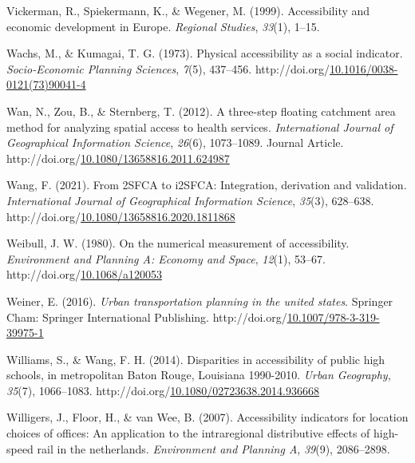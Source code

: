 \documentclass[
11pt, %
oneside, %
english, %
singlespacing, %
]{macthesis} %
\newlength{\cslhangindent}
\newenvironment{CSLReferences}[2] %
{\begin{list}{}{%
	\setlength{\itemindent}{0pt}
	\setlength{\leftmargin}{0pt}
	\setlength{\parsep}{0pt}
	\ifodd #1
	\setlength{\leftmargin}{\cslhangindent}
	\setlength{\itemindent}{-1\cslhangindent}
	\fi
	\setlength{\itemsep}{#2\baselineskip}}}
{\end{list}}
\begin{document}
\begin{CSLReferences}{1}{0}
Vickerman, R., Spiekermann, K., \& Wegener, M. (1999). Accessibility and economic development in {Europe}. \emph{Regional Studies}, \emph{33}(1), 1--15.

Wachs, M., \& Kumagai, T. G. (1973). Physical accessibility as a social indicator. \emph{Socio-Economic Planning Sciences}, \emph{7}(5), 437--456. http://doi.org/\href{https://doi.org/10.1016/0038-0121(73)90041-4}{10.1016/0038-0121(73)90041-4}

Wan, N., Zou, B., \& Sternberg, T. (2012). A three-step floating catchment area method for analyzing spatial access to health services. \emph{International Journal of Geographical Information Science}, \emph{26}(6), 1073--1089. Journal Article. http://doi.org/\href{https://doi.org/10.1080/13658816.2011.624987}{10.1080/13658816.2011.624987}

Wang, F. (2021). From {2SFCA} to {i2SFCA}: Integration, derivation and validation. \emph{International Journal of Geographical Information Science}, \emph{35}(3), 628--638. http://doi.org/\href{https://doi.org/10.1080/13658816.2020.1811868}{10.1080/13658816.2020.1811868}

Weibull, J. W. (1980). On the numerical measurement of accessibility. \emph{Environment and Planning A: Economy and Space}, \emph{12}(1), 53--67. http://doi.org/\href{https://doi.org/10.1068/a120053}{10.1068/a120053}

Weiner, E. (2016). \emph{Urban transportation planning in the united states}. Springer Cham: Springer International Publishing. http://doi.org/\href{https://doi.org/10.1007/978-3-319-39975-1}{10.1007/978-3-319-39975-1}

Williams, S., \& Wang, F. H. (2014). Disparities in accessibility of public high schools, in metropolitan {Baton} {Rouge}, {Louisiana} 1990-2010. \emph{Urban Geography}, \emph{35}(7), 1066--1083. http://doi.org/\href{https://doi.org/10.1080/02723638.2014.936668}{10.1080/02723638.2014.936668}

Willigers, J., Floor, H., \& van Wee, B. (2007). Accessibility indicators for location choices of offices: An application to the intraregional distributive effects of high-speed rail in the netherlands. \emph{Environment and Planning A}, \emph{39}(9), 2086--2898.


\end{CSLReferences}
\end{document}
